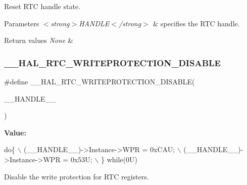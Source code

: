 Reset R\+TC handle state. 


\begin{DoxyParams}{Parameters}
{\em $<$strong$>$\+H\+A\+N\+D\+L\+E$<$/strong$>$} & specifies the R\+TC handle. \\
\hline
\end{DoxyParams}

\begin{DoxyRetVals}{Return values}
{\em None} & \\
\hline
\end{DoxyRetVals}
\mbox{\label{group___r_t_c___exported___macros_gae150645fb78c1d175b9e0f88fc3f4ad4}} 
\subsubsection{\texorpdfstring{\+\_\+\+\_\+\+H\+A\+L\+\_\+\+R\+T\+C\+\_\+\+W\+R\+I\+T\+E\+P\+R\+O\+T\+E\+C\+T\+I\+O\+N\+\_\+\+D\+I\+S\+A\+B\+LE}{\_\_HAL\_RTC\_WRITEPROTECTION\_DISABLE}}
{\footnotesize\ttfamily \#define \+\_\+\+\_\+\+H\+A\+L\+\_\+\+R\+T\+C\+\_\+\+W\+R\+I\+T\+E\+P\+R\+O\+T\+E\+C\+T\+I\+O\+N\+\_\+\+D\+I\+S\+A\+B\+LE(\begin{DoxyParamCaption}\item[{}]{\+\_\+\+\_\+\+H\+A\+N\+D\+L\+E\+\_\+\+\_\+ }\end{DoxyParamCaption})}

{\bfseries Value\+:}
\begin{DoxyCode}
\textcolor{keywordflow}{do}\{                                       \(\backslash\)
                            (\_\_HANDLE\_\_)->Instance->WPR = 0xCAU;  \(\backslash\)
                            (\_\_HANDLE\_\_)->Instance->WPR = 0x53U;  \(\backslash\)
                          \} \textcolor{keywordflow}{while}(0U)
\end{DoxyCode}


Disable the write protection for R\+TC registers. 


